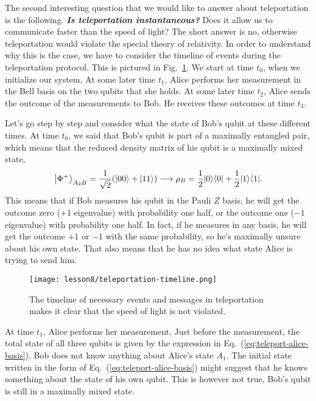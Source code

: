The second interesting question that we would like to answer about teleportation is the following.
\textbf{\emph{Is teleportation instantaneous?}}
Does it allow us to communicate faster than the speed of light?
The short answer is no, otherwise teleportation would violate the special theory of relativity.
In order to understand why this is the case, we have to consider the timeline of events during the teleportation protocol.
This is pictured in Fig.~\ref{fig:teleportation-timeline}.
We start at time $t_0$, when we initialize our system.
At some later time $t_1$, Alice performs her measurement in the Bell basis on the two qubits that she holds.
At some later time $t_2$, Alice sends the outcome of the measurements to Bob.
He receives these outcomes at time $t_3$.

Let's go step by step and consider what the state of Bob's qubit at these different times.
At time $t_0$, we said that Bob's qubit is part of a maximally entangled pair, which means that the reduced density matrix of his qubit is a maximally mixed state,
\begin{equation}
    \left|\Phi^{+}\right\rangle_{A_2 B}=\frac{1}{\sqrt{2}}(|00\rangle+|11\rangle) \longrightarrow \rho_B=\frac{1}{2}|0 \rangle \langle 0| +\frac{1}{2}|1 \rangle \langle 1|.
\end{equation}
This means that if Bob measures his qubit in the Pauli $Z$ basis, he will get the outcome zero ($+1$ eigenvalue) with probability one half, or the outcome one ($-1$ eigenvalue) with probability one half. In fact, if he measures in any basis, he will get the outcome $+1$ or $-1$ with the same probability, so he's maximally unsure about his own state. That also means that he has no idea what state Alice is trying to send him.
\begin{figure}[t]
    \centering
    \texttt{[image: lesson8/teleportation-timeline.png]}
        \caption[Event timing in teleportation.]{The timeline of necessary events and messages in teleportation makes it clear that the speed of light is not violated.}
    \label{fig:teleportation-timeline}
\end{figure}

At time $t_1$, Alice performs her measurement.
Just before the measurement, the total state of all three qubits is given by the expression in Eq.~(\ref{eq:teleport-alice-basis}).
Bob does not know anything about Alice's state $A_1$.
The initial state written in the form of Eq.~(\ref{eq:teleport-alice-basis}) might suggest that he knows something about the state of his own qubit.
This is however not true, Bob's qubit is still in a maximally mixed state.

